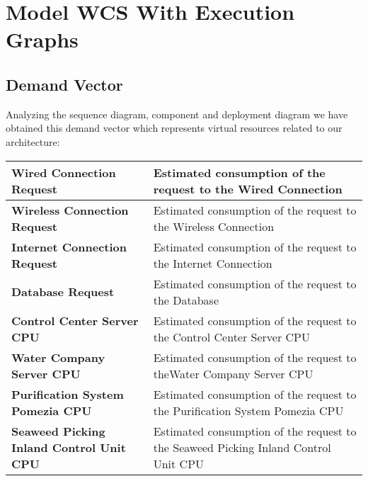 \newpage \chapter{\textbf{Model WCS With Execution Graphs}}

\section{Demand Vector}

Analyzing the sequence diagram, component and deployment diagram we have obtained this demand vector which represents virtual resources related to our architecture:

\begin{longtable}{|p{6cm}|p{9cm}|}

\hline
\textbf{Wired Connection Request} & Estimated consumption of the 											request to the Wired Connection \\

\hline
\textbf{Wireless Connection Request} & Estimated consumption of the 										   request to the Wireless 												   Connection \\

\hline
\textbf{Internet Connection Request} & Estimated consumption of the 										   request to the Internet 												   Connection \\

\hline
\textbf{Database Request} & Estimated consumption of the request to 								the Database \\ 

\hline
\textbf{Control Center Server CPU} & Estimated consumption of the 											 request to the Control Center 											 Server CPU\\

\hline
\textbf{Water Company Server CPU} & Estimated consumption of the 											request to theWater Company Server										CPU\\

\hline
\textbf{Purification System Pomezia CPU} & Estimated consumption of 											   the request to the 													   Purification System Pomezia 										   CPU\\


\hline
\textbf{Seaweed Picking Inland Control Unit CPU} & Estimated 															   consumption of 											   			   the request to the 													   Seaweed Picking 														   Inland Control Unit 												   CPU\\


\end{longtable}
